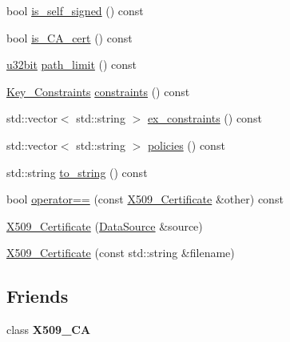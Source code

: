 \begin{DoxyCompactItemize}
\item 
bool \hyperlink{classBotan_1_1X509__Certificate_a36b926e34937efec33dbb4812f234661}{is\-\_\-self\-\_\-signed} () const 
\item 
bool \hyperlink{classBotan_1_1X509__Certificate_a102201779a0170f9fc51cb40bab94be6}{is\-\_\-\-C\-A\-\_\-cert} () const 
\item 
\hyperlink{namespaceBotan_aacc7d03c95e97e76168fc1c819031830}{u32bit} \hyperlink{classBotan_1_1X509__Certificate_ababf6d36ba61e09b79877a168c84517e}{path\-\_\-limit} () const 
\item 
\hyperlink{namespaceBotan_aed0885e5c70627dd43827b966e727654}{Key\-\_\-\-Constraints} \hyperlink{classBotan_1_1X509__Certificate_a91987e81b27fca02660b9cc604d1dbe9}{constraints} () const 
\item 
std\-::vector$<$ std\-::string $>$ \hyperlink{classBotan_1_1X509__Certificate_a5956530a1548e50c8c388300c7d9bbae}{ex\-\_\-constraints} () const 
\item 
std\-::vector$<$ std\-::string $>$ \hyperlink{classBotan_1_1X509__Certificate_a96075daf46dd5cdbe691df6c3a9a58a6}{policies} () const 
\item 
std\-::string \hyperlink{classBotan_1_1X509__Certificate_a0d2ded939a1a68fe03335f83be73d779}{to\-\_\-string} () const 
\item 
bool \hyperlink{classBotan_1_1X509__Certificate_a1fc6fc632d2c12773accd88372df35de}{operator==} (const \hyperlink{classBotan_1_1X509__Certificate}{X509\-\_\-\-Certificate} \&other) const 
\item 
\hyperlink{classBotan_1_1X509__Certificate_ab81b542e7dabae681bd27ec6c263d683}{X509\-\_\-\-Certificate} (\hyperlink{classBotan_1_1DataSource}{Data\-Source} \&source)
\item 
\hyperlink{classBotan_1_1X509__Certificate_a5b5f1498124453213f8ed3722e72860e}{X509\-\_\-\-Certificate} (const std\-::string \&filename)
\end{DoxyCompactItemize}
\subsection*{Friends}
\begin{DoxyCompactItemize}
\item 
\hypertarget{classBotan_1_1X509__Certificate_a5b487dea15372327395cfc24f5a77867}{class {\bfseries X509\-\_\-\-C\-A}}\label{classBotan_1_1X509__Certificate_a5b487dea15372327395cfc24f5a77867}

\end{DoxyCompactItemize}
